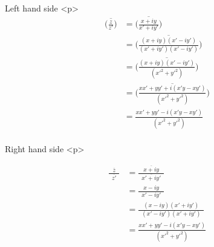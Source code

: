 Left hand side
<p>
$$\begin{aligned}\overline{\bigg(\frac{z}{z'}\bigg)} &=  \overline{\bigg(\frac{x+iy}{x'+iy'}\bigg)}\\
&= \overline{\bigg(\frac{(x+iy)(x'-iy')}{(x'+iy')(x'-iy')}\bigg)}\\
&= \overline{\bigg(\frac{(x+iy)(x'-iy')}{(x'^2+y'^2)}\bigg)}\\
&= \overline{\bigg(\frac{xx'+yy'+i(x'y-xy')}{(x'^2+y'^2)}\bigg)}\\
&= \frac{xx'+yy'-i(x'y-xy')}{(x'^2+y'^2)}\\
\end{aligned} $$

Right hand side
<p>



$$\begin{aligned}\frac{\overline{z}}{\enspace \overline{z'} \enspace} &= \frac{\overline{x+iy}}{\enspace \overline{x'+iy'} \enspace}\\
&= \frac{x-iy}{\enspace x'-iy' \enspace}\\
&= \frac{(x-iy)(x'+iy')}{\enspace (x'-iy')(x'+iy') \enspace}\\
&= \frac{xx'+yy'-i(x'y-xy')}{\enspace (x'^2+y'^2) \enspace}\\
\end{aligned}$$
